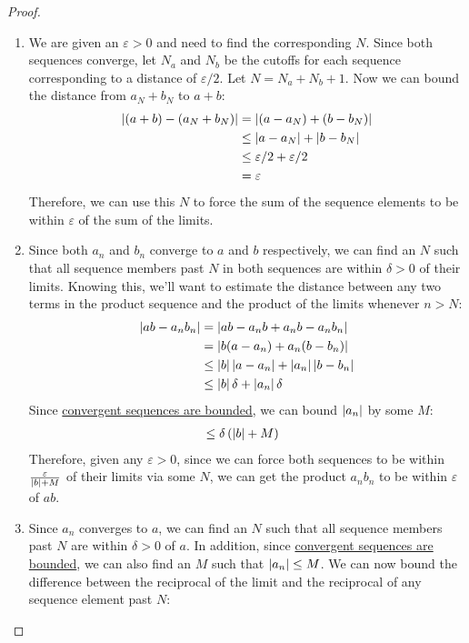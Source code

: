 \documentclass{refbook}
\begin{document}
\begin{proof}
\begin{enumerate}
\item We are given an $\varepsilon > 0$ and need to find the corresponding $N$. Since both sequences converge, let $N_a$ and $N_b$ be the cutoffs for each sequence corresponding to a distance of $\varepsilon/2$. Let $N = N_a + N_b + 1$. Now we can bound the distance from $a_N+b_N$ to $a+b$:
\begin{align*}
\left\lvert (a+b)-(a_N+b_N) \right\rvert &= \left\lvert (a-a_N)+(b-b_N) \right\rvert\\
&\leq \left\lvert a-a_N \right\rvert+\left\lvert b-b_N \right\rvert\\
&\leq \varepsilon/2 + \varepsilon/2\\
&= \varepsilon
\end{align*}
Therefore, we can use this $N$ to force the sum of the sequence elements to be within $\varepsilon$ of the sum of the limits.
\item Since both $a_n$ and $b_n$ converge to $a$ and $b$ respectively, we can find an $N$ such that all sequence members past $N$ in both sequences are within $\delta > 0$ of their limits. Knowing this, we'll want to estimate the distance between any two terms in the product sequence and the product of the limits whenever $n>N$:
\begin{align*}
\left\lvert ab-a_nb_n \right\rvert &= \left\lvert ab-a_nb+a_nb-a_nb_n \right\rvert\\
&= \left\lvert b(a-a_n)+a_n(b-b_n) \right\rvert\\
&\leq \left\lvert b \right\rvert\left\lvert a-a_n \right\rvert + \left\lvert a_n \right\rvert\left\lvert b-b_n \right\rvert\\
&\leq \left\lvert b \right\rvert\delta + \left\lvert a_n \right\rvert\delta
\end{align*}
Since \hyperlink{Convergent Sequences are Bounded}{convergent sequences are bounded}, we can bound $\left\lvert a_n \right\rvert$ by some $M$:
\begin{align*}
&\leq \delta\left(\left\lvert b \right\rvert+M\right)
\end{align*}
Therefore, given any $\varepsilon > 0$, since we can force both sequences to be within $\frac{\varepsilon}{\left\lvert b \right\rvert+M}$ of their limits via some $N$, we can get the product $a_nb_n$ to be within $\varepsilon$ of $ab$.
\item Since $a_n$ converges to $a$, we can find an $N$ such that all sequence members past $N$ are within $\delta > 0$ of $a$. In addition, since \hyperlink{Convergent Sequences are Bounded}{convergent sequences are bounded}, we can also find an $M$ such that $\left\lvert a_n \right\rvert\leq M$. We can now bound the difference between the reciprocal of the limit and the reciprocal of any sequence element past $N$:

\end{enumerate}
\end{proof}
\end{document}
